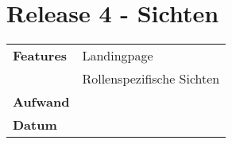\section*{Release 4 - Sichten}
\label{sec:release_4}

\begin{tabular}{p{5cm} p{9cm}}
    \textbf{Features} &  Landingpage \\
    & Rollenspezifische Sichten \\
    \hline
    \textbf{Aufwand} & \\
    \hline
    \textbf{Datum} & 
\end{tabular}